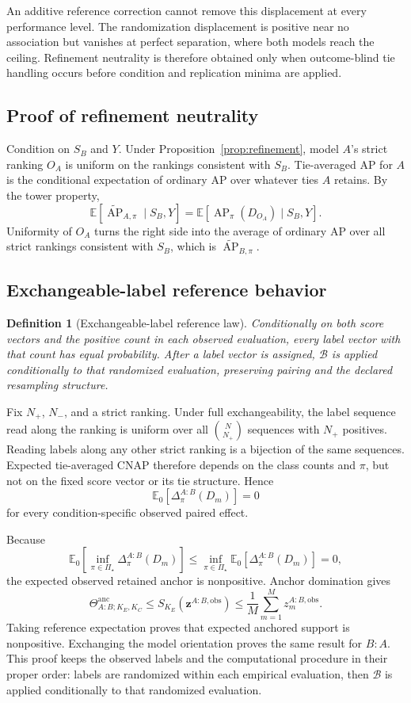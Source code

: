 \documentclass[11pt]{article}
\newcommand{\AP}{\operatorname{AP}}
\newcommand{\PSet}{\Pi_\star}
\newcommand{\Boot}{\mathcal{B}}
\newcommand{\E}{\mathbb{E}}
\newcommand{\APta}{\widetilde{\AP}}
\newcommand{\Thetaanc}{\Theta^{\mathrm{anc}}}
\newtheorem{definition}{Definition}
\theoremstyle{remark}
\begin{document}
An additive reference correction cannot remove this displacement at every
performance level. The randomization displacement is positive near no
association but vanishes at perfect separation, where both models reach the
ceiling. Refinement neutrality is therefore obtained only when outcome-blind
tie handling occurs before condition and replication minima are applied.

\subsection{Proof of refinement neutrality}

Condition on $S_B$ and $Y$. Under Proposition~\ref{prop:refinement}, model
$A$'s strict ranking $O_A$ is uniform on the rankings consistent with $S_B$.
Tie-averaged AP for $A$ is the conditional expectation of ordinary AP over
whatever ties $A$ retains. By the tower property,
\[
\E[\APta_{A,\pi}\mid S_B,Y]
=
\E[\AP_\pi(D_{O_A})\mid S_B,Y].
\]
Uniformity of $O_A$ turns the right side into the average of ordinary AP over
all strict rankings consistent with $S_B$, which is $\APta_{B,\pi}$.

\subsection{Exchangeable-label reference behavior}

\begin{definition}[Exchangeable-label reference law]
Conditionally on both score vectors and the positive count in each observed
evaluation, every label vector with that count has equal probability. After a
label vector is assigned, $\Boot$ is applied conditionally to that randomized
evaluation, preserving pairing and the declared resampling structure.
\end{definition}

Fix $N_+$, $N_-$, and a strict ranking. Under full exchangeability, the label
sequence read along the ranking is uniform over all $\binom N{N_+}$ sequences
with $N_+$ positives. Reading labels along any other strict ranking is a
bijection of the same sequences. Expected tie-averaged CNAP therefore depends
on the class counts and $\pi$, but not on the fixed score vector or its tie
structure. Hence
\begin{equation}
\E_0[\Delta^{A:B}_\pi(D_m)]=0
\label{eq:reference-cell}
\end{equation}
for every condition-specific observed paired effect.

Because
\[
\E_0\!\left[
\inf_{\pi\in\PSet}\Delta^{A:B}_\pi(D_m)
\right]
\leq
\inf_{\pi\in\PSet}
\E_0[\Delta^{A:B}_\pi(D_m)]
=0,
\]
the expected observed retained anchor is nonpositive. Anchor domination gives
\[
\Thetaanc_{A:B;K_E,K_C}
\leq
S_{K_E}(\mathbf z^{A:B,\mathrm{obs}})
\leq
\frac1M\sum_{m=1}^Mz_m^{A:B,\mathrm{obs}}.
\]
Taking reference expectation proves that expected anchored support is
nonpositive. Exchanging the model orientation proves the same result for
$B:A$. This proof keeps the observed labels and the computational procedure in
their proper order: labels are randomized within each empirical evaluation,
then $\Boot$ is applied conditionally to that randomized evaluation.
\end{document}
